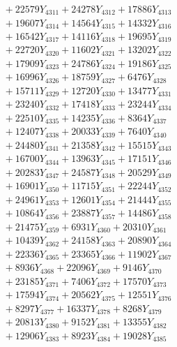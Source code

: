 \documentclass[a4paper,10pt]{article}
\begin{document}
{\begin{align}
&\;  + 22579 Y_{4311} + 24278 Y_{4312} + 17886 Y_{4313} \\[0.3ex]
&\;  + 19607 Y_{4314} + 14564 Y_{4315} + 14332 Y_{4316} \\[0.3ex]
&\;  + 16542 Y_{4317} + 14116 Y_{4318} + 19695 Y_{4319} \\[0.5ex]\allowbreak
&\;  + 22720 Y_{4320} + 11602 Y_{4321} + 13202 Y_{4322} \\[0.3ex]
&\;  + 17909 Y_{4323} + 24786 Y_{4324} + 19186 Y_{4325} \\[0.3ex]
&\;  + 16996 Y_{4326} + 18759 Y_{4327} + 6476 Y_{4328} \\[0.3ex]
&\;  + 15711 Y_{4329} + 12720 Y_{4330} + 13477 Y_{4331} \\[0.3ex]
&\;  + 23240 Y_{4332} + 17418 Y_{4333} + 23244 Y_{4334} \\[0.3ex]
&\;  + 22510 Y_{4335} + 14235 Y_{4336} + 8364 Y_{4337} \\[0.3ex]
&\;  + 12407 Y_{4338} + 20033 Y_{4339} + 7640 Y_{4340} \\[0.3ex]
&\;  + 24480 Y_{4341} + 21358 Y_{4342} + 15515 Y_{4343} \\[0.3ex]
&\;  + 16700 Y_{4344} + 13963 Y_{4345} + 17151 Y_{4346} \\[0.3ex]
&\;  + 20283 Y_{4347} + 24587 Y_{4348} + 20529 Y_{4349} \\[0.5ex]\allowbreak
&\;  + 16901 Y_{4350} + 11715 Y_{4351} + 22244 Y_{4352} \\[0.3ex]
&\;  + 24961 Y_{4353} + 12601 Y_{4354} + 21444 Y_{4355} \\[0.3ex]
&\;  + 10864 Y_{4356} + 23887 Y_{4357} + 14486 Y_{4358} \\[0.3ex]
&\;  + 21475 Y_{4359} + 6931 Y_{4360} + 20310 Y_{4361} \\[0.3ex]
&\;  + 10439 Y_{4362} + 24158 Y_{4363} + 20890 Y_{4364} \\[0.3ex]
&\;  + 22336 Y_{4365} + 23365 Y_{4366} + 11902 Y_{4367} \\[0.3ex]
&\;  + 8936 Y_{4368} + 22096 Y_{4369} + 9146 Y_{4370} \\[0.3ex]
&\;  + 23185 Y_{4371} + 7406 Y_{4372} + 17570 Y_{4373} \\[0.3ex]
&\;  + 17594 Y_{4374} + 20562 Y_{4375} + 12551 Y_{4376} \\[0.3ex]
&\;  + 8297 Y_{4377} + 16337 Y_{4378} + 8268 Y_{4379} \\[0.5ex]\allowbreak
&\;  + 20813 Y_{4380} + 9152 Y_{4381} + 13355 Y_{4382} \\[0.3ex]
&\;  + 12906 Y_{4383} + 8923 Y_{4384} + 19028 Y_{4385} \\[0.3ex]

\end{align}}
\end{document}
